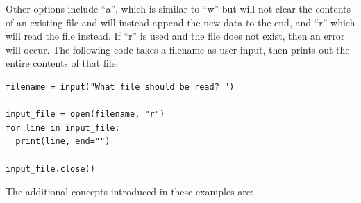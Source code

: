 \documentclass[11pt]{cselabheader}
\begin{document}
Other options include ``a'', which is similar to ``w'' but will not clear the contents of an existing file and will instead append the new data to the end, and ``r'' which will read the file instead. If ``r'' is used and the file does not exist, then an error will occur. The following code takes a filename as user input, then prints out the entire contents of that file.

\begin{lstlisting}[style=python]
filename = input("What file should be read? ")

input_file = open(filename, "r")
for line in input_file:
  print(line, end="")

input_file.close()
\end{lstlisting}

The additional concepts introduced in these examples are:
\end{document}
